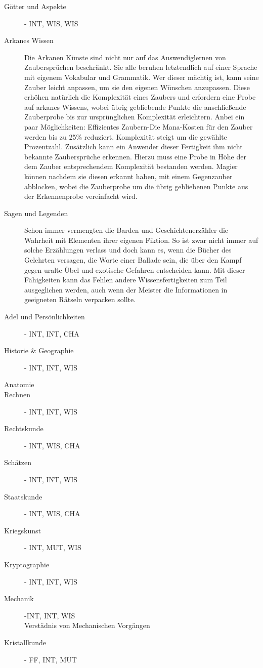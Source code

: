 \documentclass[a4paper,12pt,oneside]{book}
\begin{document}
\begin{description}
\item[Götter und Aspekte]- INT, WIS, WIS
\item[Arkanes Wissen]Die Arkanen Künste sind nicht nur auf das Auswendiglernen von Zaubersprüchen beschränkt. Sie alle beruhen letztendlich auf einer Sprache mit eigenem Vokabular und Grammatik. Wer dieser mächtig ist, kann seine Zauber leicht anpassen, um sie den eigenen Wünschen anzupassen. Diese erhöhen natürlich die Komplexität eines Zaubers und erfordern eine Probe auf arkanes Wissens, wobei übrig gebliebende Punkte die anschließende Zauberprobe bis zur ursprünglichen Komplexität erleichtern. Anbei ein paar Möglichkeiten:
Effizientes Zaubern-Die Mana-Kosten für den Zauber werden bis zu 25\% reduziert. Komplexität steigt um die gewählte Prozentzahl.
Zusätzlich kann ein Anwender dieser Fertigkeit ihm nicht bekannte Zaubersprüche erkennen. Hierzu muss eine Probe in Höhe der dem Zauber entsprechendem Komplexität bestanden werden. Magier können nachdem sie diesen erkannt haben, mit einem Gegenzauber abblocken, wobei die Zauberprobe um die übrig gebliebenen Punkte aus der Erkennenprobe vereinfacht wird.
\item[Sagen und Legenden]Schon immer vermengten die Barden und Geschichtenerzähler die Wahrheit mit Elementen ihrer eigenen Fiktion. So ist zwar nicht immer auf solche Erzählungen verlass und doch kann es, wenn die Bücher des Gelehrten versagen, die Worte einer Ballade sein, die über den Kampf gegen uralte Übel und exotische Gefahren entscheiden kann. Mit dieser Fähigkeiten kann das Fehlen andere Wissensfertigkeiten zum Teil ausgeglichen werden, auch wenn der Meister die Informationen in geeigneten Rätseln verpacken sollte.
\item[Adel und Persönlichkeiten]- INT, INT, CHA
\item[Historie \& Geographie]- INT, INT, WIS
\item[Anatomie]
\item[Rechnen]- INT, INT, WIS
\item[Rechtskunde]- INT, WIS, CHA
\item[Schätzen]- INT, INT, WIS
\item[Staatskunde]- INT, WIS, CHA
\item[Kriegskunst]- INT, MUT, WIS
\item[Kryptographie]- INT, INT, WIS
\item[Mechanik]-INT, INT, WIS
\\Verstädnis von Mechanischen Vorgängen
\item[Kristallkunde]- FF, INT, MUT
\end{description}
\end{document}
